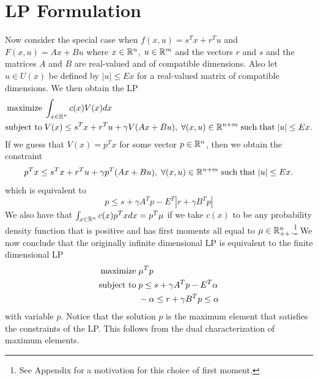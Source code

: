 \documentclass{article}
\begin{document}
\section{LP Formulation}
%
Now consider the special case when $f(x,u)=s^Tx+r^Tu$ and 
$F(x,u)=Ax+Bu$ where $x\in\mathbb{R}^n$, $u\in\mathbb{R}^m$ and the vectors
$r$ and $s$ and the matrices $A$ and $B$ are real-valued and of 
compatible dimensions. Also let $u\in U(x)$ be defined by $|u|\leq Ex$ for a
real-valued matrix of compatible dimensions. We then obtain the LP
%
\begin{align*}
\mbox{maximize}\;&\int_{x\in \mathbb{R}^n}c(x)V(x)dx\\
\mbox{subject to} \;&V(x)\leq s^Tx+r^Tu+\gamma V(Ax+Bu),\;\forall (x,u)\in\mathbb{R}^{n+m}\;
{\rm such\; that}\; |u|\leq Ex.
\end{align*}
%
If we guess that $V(x)=p^Tx$ for some vector $p\in\mathbb{R}^n$, then we obtain
the constraint
%
$$p^Tx\leq s^Tx+r^Tu+\gamma p^T(Ax+Bu),\;\forall (x,u)\in\mathbb{R}^{n+m}\;
{\rm such\; that}\; |u|\leq Ex.$$
%
which is equivalent to 
%
$$p\leq s+\gamma A^Tp-E^T|r+\gamma B^Tp|$$
%
We also have that $\int_{x\in \mathbb{R}^n}c(x)p^Txdx=p^T\mu$ if we take 
$c(x)$ to be any
probability density function that is positive and has first moments all
equal to $\mu\in\mathbb{R}_{++}^n$.\footnote{See Appendix for a motivation for this choice of first moment.}
We now conclude that the originally infinite dimensional LP is 
equivalent to the finite dimensional LP
%
\begin{align*}
\mbox{maximize}\;&\mu^Tp\\
\mbox{subject to} \;&p\leq s+\gamma A^Tp-E^T\alpha\\
&-\alpha\leq r+\gamma B^Tp\leq \alpha
\end{align*}
%
with variable $p$. Notice that the solution $p$ is the maximum element that satisfies
the constraints of the LP. This follows from the dual characterization of maximum 
elements. 
%
\end{document}
